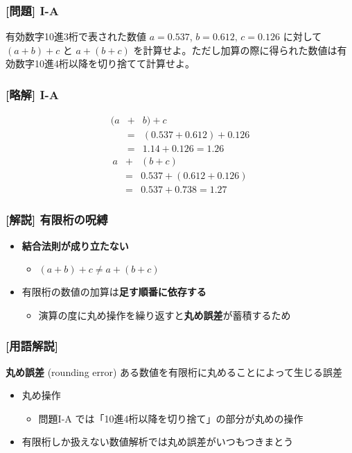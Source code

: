 \documentclass[dvipdfmx,aspectratio=169,20pt]{beamer}
\newcommand{\firstreportid}[0]{I}
\begin{document}
\begin{frame}
\frametitle{[問題] \firstreportid-A}
有効数字10進3桁で表された数値 $a=0.537$, $b=0.612$, $c=0.126$ に対して $(a+b)+c$ と $a+(b+c)$ を計算せよ。ただし加算の際に得られた数値は有効数字10進4桁以降を切り捨てて計算せよ。
\end{frame}
\begin{frame}
\frametitle{[略解] \firstreportid-A}
\vspace{-1cm}
\begin{eqnarray*}
    (a&+&b)+c\\
    &=&(0.537+0.612)+0.126\\
    &=&1.14+0.126=1.26
\end{eqnarray*}
\begin{eqnarray*}
    a&+&(b+c)\\
    &=&0.537+(0.612+0.126)\\
    &=&0.537+0.738=1.27
\end{eqnarray*}
\end{frame}
\begin{frame}
\frametitle{{\large [解説] 有限桁の呪縛}}
\begin{itemize}
    \setlength{\itemsep}{0.5cm}
    \item {\bf 結合法則が成り立たない}
    \begin{itemize}
        \item $(a+b)+c\neq a+(b+c)$
    \end{itemize}
    \item 有限桁の数値の加算は{\bf 足す順番に依存する}
    \begin{itemize}
        \item 演算の度に丸め操作を繰り返すと{\bf 丸め誤差}が蓄積するため
    \end{itemize}
\end{itemize}
\end{frame}
\begin{frame}
\frametitle{{\large [用語解説]}}
\begin{block}{{\bf 丸め誤差} {\small (rounding error)}}
ある数値を有限桁に丸めることによって生じる誤差
\end{block}
\begin{itemize}
    \item 丸め操作
    \begin{itemize}
        \item 問題\firstreportid-A では「10進4桁以降を切り捨て」の部分が丸めの操作
    \end{itemize}
    \item 有限桁しか扱えない数値解析では丸め誤差がいつもつきまとう
\end{itemize}
\end{frame}
\end{document}
